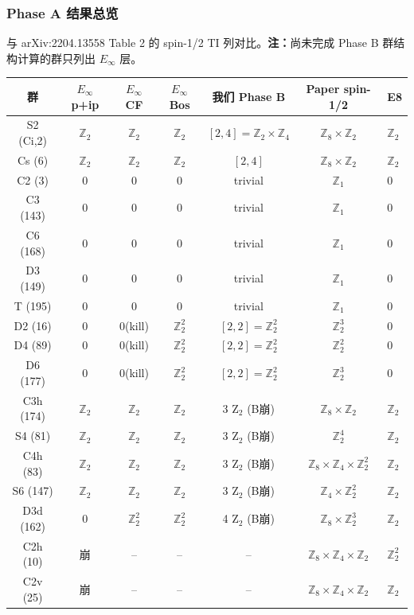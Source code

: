 \documentclass[a4paper,fontset=ubuntu,12pt]{ctexart}
\newcommand{\ZZ}{\mathbb{Z}}
\begin{document}
\subsubsection{Phase A 结果总览}

与 arXiv:2204.13558 Table 2 的 spin-1/2 TI 列对比。\textbf{注：}尚未完成 Phase B 群结构计算的群只列出 $E_\infty$ 层。

\begin{center}
\begin{tabular}{c|c|c|c|c|c|l}
\hline
群 & $E_\infty$ p+ip & $E_\infty$ CF & $E_\infty$ Bos & 我们 Phase B & Paper spin-1/2 & E8 \\
\hline
S2 (Ci,2) & $\ZZ_2$ & $\ZZ_2$ & $\ZZ_2$ & $[2,4]=\ZZ_2\times\ZZ_4$ & $\ZZ_8\times\ZZ_2$ & $\ZZ_2$ \\
Cs (6) & $\ZZ_2$ & $\ZZ_2$ & $\ZZ_2$ & $[2,4]$ & $\ZZ_8\times\ZZ_2$ & $\ZZ_2$ \\
C2 (3) & 0 & 0 & 0 & trivial & $\ZZ_1$ & 0 \\
C3 (143) & 0 & 0 & 0 & trivial & $\ZZ_1$ & 0 \\
C6 (168) & 0 & 0 & 0 & trivial & $\ZZ_1$ & 0 \\
D3 (149) & 0 & 0 & 0 & trivial & $\ZZ_1$ & 0 \\
T (195) & 0 & 0 & 0 & trivial & $\ZZ_1$ & 0 \\
\hline
D2 (16) & 0 & 0(kill) & $\ZZ_2^2$ & $[2,2]=\ZZ_2^2$ & $\ZZ_2^3$ & 0 \\
D4 (89) & 0 & 0(kill) & $\ZZ_2^2$ & $[2,2]=\ZZ_2^2$ & $\ZZ_2^2$ & 0 \\
D6 (177) & 0 & 0(kill) & $\ZZ_2^2$ & $[2,2]=\ZZ_2^2$ & $\ZZ_2^3$ & 0 \\
\hline
C3h (174) & $\ZZ_2$ & $\ZZ_2$ & $\ZZ_2$ & 3 Z$_2$ (B崩) & $\ZZ_8\times\ZZ_2$ & $\ZZ_2$ \\
S4 (81) & $\ZZ_2$ & $\ZZ_2$ & $\ZZ_2$ & 3 Z$_2$ (B崩) & $\ZZ_2^4$ & $\ZZ_2$ \\
C4h (83) & $\ZZ_2$ & $\ZZ_2$ & $\ZZ_2$ & 3 Z$_2$ (B崩) & $\ZZ_8\times\ZZ_4\times\ZZ_2^2$ & $\ZZ_2$ \\
S6 (147) & $\ZZ_2$ & $\ZZ_2$ & $\ZZ_2$ & 3 Z$_2$ (B崩) & $\ZZ_4\times\ZZ_2^2$ & $\ZZ_2$ \\
D3d (162) & 0 & $\ZZ_2^2$ & $\ZZ_2^2$ & 4 Z$_2$ (B崩) & $\ZZ_8\times\ZZ_2^3$ & $\ZZ_2$ \\
\hline
C2h (10) & 崩 & -- & -- & -- & $\ZZ_8\times\ZZ_4\times\ZZ_2$ & $\ZZ_2^2$ \\
C2v (25) & 崩 & -- & -- & -- & $\ZZ_8\times\ZZ_4\times\ZZ_2$ & $\ZZ_2$ \\

\end{tabular}
\end{center}
\end{document}
